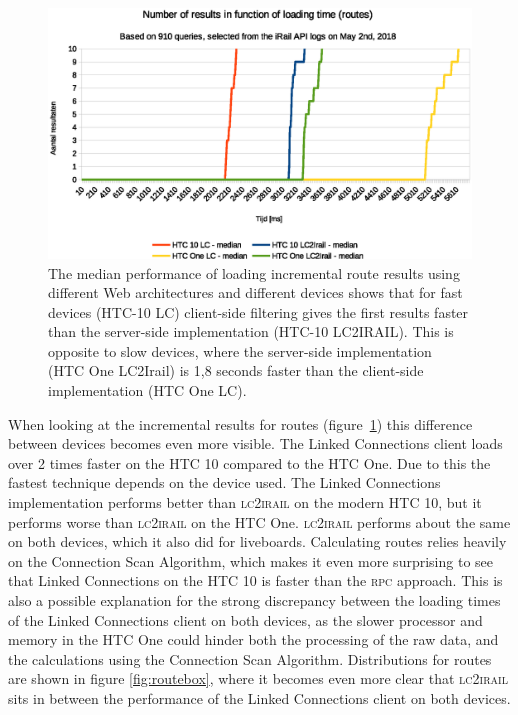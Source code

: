 \documentclass[twocolumn]{phdsymp} %
\begin{document}
\begin{figure}[ht]
	\begin{center}
		\includegraphics[width=.50\textwidth]{images/dief_routes_average.eps}
		\caption{\label{fig:route} The median performance of loading incremental route results using different Web architectures and different devices shows that for fast devices (HTC-10 LC) client-side filtering gives the first results faster than the server-side implementation (HTC-10 LC2IRAIL). This is opposite to slow devices, where the server-side implementation (HTC One LC2Irail) is 1,8 seconds faster than the client-side implementation (HTC One LC).}
	\end{center}
\end{figure}

When looking at the incremental results for routes (figure~\ref{fig:route}) this difference between devices becomes even more visible. The Linked Connections client loads over 2 times faster on the HTC 10 compared to the HTC One. Due to this the fastest technique depends on the device used. The Linked Connections implementation performs better than \textsc{lc2irail} on the modern HTC 10, but it performs worse than \textsc{lc2irail} on the HTC One. \textsc{lc2irail} performs about the same on both devices, which it also did for liveboards. Calculating routes relies heavily on the Connection Scan Algorithm, which makes it even more surprising to see that Linked Connections on the HTC 10 is faster than the \textsc{rpc} approach. This is also a possible explanation for the strong discrepancy between the loading times of the Linked Connections client on both devices, as the slower processor and memory in the HTC One could hinder both the processing of the raw data, and the calculations using the Connection Scan Algorithm. Distributions for routes are shown in figure \ref{fig:routebox}, where it becomes even more clear that \textsc{lc2irail} sits in between the performance of the Linked Connections client on both devices.
\end{document}
